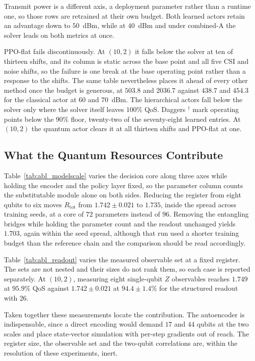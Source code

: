 \documentclass[12pt,onecolumn]{IEEEtran}
\newif\iffull
\begin{document}
Transmit power is a different axis, a deployment parameter rather than a runtime one, so
those rows are retrained at their own budget. Both learned actors retain an advantage down
to $50$~dBm, while at $40$~dBm and under combined-A the solver leads on both metrics at
once.

PPO-flat fails discontinuously. At $(10,2)$ it falls below the solver at ten of thirteen
shifts, and its column is static across the base point and all five CSI and noise shifts,
 so the failure is one break at the base operating
point rather than a response to the shifts. The same table nevertheless places it ahead of
every other method once the budget is generous, at $503.8$ and $2036.7$ against $438.7$ and
$454.3$ for the classical actor at $60$ and $70$~dBm. The hierarchical actors fall below the
solver only where the solver itself leaves $100\%$ QoS. Daggers $^{\dagger}$ mark operating points 
below the $90\%$ floor, twenty-two of the seventy-eight
learned entries. At $(10,2)$ the quantum actor clears it at all thirteen shifts and
PPO-flat at one.


\iffull

\subsection{What the Quantum Resources Contribute}
\label{sec:results_quantum}

Table~\ref{tab:abl_modelscale} varies the decision core along three axes while holding the
encoder and the policy layer fixed, so the parameter column counts the substitutable module
alone on both sides. Reducing the register from eight qubits to six moves $R_{\mathrm{tot}}$
from $1.742 \pm 0.021$ to $1.735$, inside the spread across training seeds, at a core of
$72$ parameters instead of $96$. Removing the entangling bridges while holding the
parameter count and the readout unchanged yields $1.703$, again within the seed spread,
although that run used a shorter training budget than the reference chain and the
comparison should be read accordingly.

Table~\ref{tab:abl_readout} varies the measured observable set at a fixed register. The
sets are not nested and their sizes do not rank them, so each case is reported separately.
At $(10,2)$, measuring eight single-qubit $Z$ observables reaches $1.749$ at $95.9\%$ QoS
against $1.742 \pm 0.021$ at $94.4 \pm 1.4\%$ for the structured readout with $26$.

Taken together these measurements locate the contribution. The autoencoder is indispensable,
since a direct encoding would demand $17$ and $44$ qubits at the two scales and place
state-vector simulation with per-step gradients out of reach. The register size, the
observable set and the two-qubit correlations are, within the resolution of these
experiments, inert.
\end{document}
